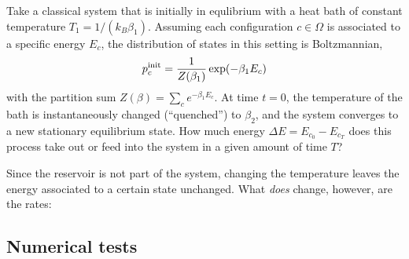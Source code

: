 Take a classical system that is initially in equlibrium with a heat bath of constant temperature \(T_1 = 1/(k_B\beta_1)\). Assuming each configuration \(c\in\Omega\) is associated to a specific energy \(E_c\), the distribution of states in this setting is Boltzmannian,
%
\begin{equation}
	p_c^{\text{init}} = \frac1{Z(\beta_1)}\operatorname{exp}(-\beta_1E_c)
\end{equation}
%
with the partition sum \(Z(\beta) = \sum_ce^{-\beta_1E_c}\). At time \(t = 0\), the temperature of the bath is instantaneously changed (``quenched'') to \(\beta_2\), and the system converges to a new stationary equilibrium state. How much energy \(\Delta E = E_{c_0} - E_{c_T}\) does this process take out or feed into the system in a given amount of time \(T\)?

Since the reservoir is not part of the system, changing the temperature leaves the energy associated to a certain state unchanged. What \emph{does} change, however, are the rates: 



\subsection{Numerical tests}




